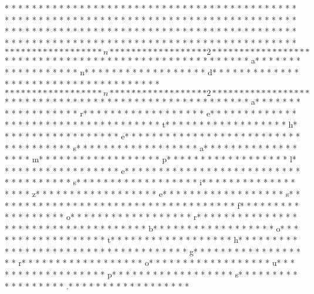 * * *  * * *  * * *  *  * * *  *  * * *  * * *  * * *  *  * * *  *  * * *  * * *  * * *  *  * * *  *  * * *  *  * * *  * * *  * * *  *  * * *  *  * * *  *  * * *  * * *  * * *  *  * * *  *  * * *  *  * * *  * * *  * * *  *  * * *  *  * * *  *  * * *  * * *  * * *  *  * * *  *  * * *  *  * * *  * * *  * * *  *  * * *  *  * * *  *  * * *  * * *  * * *  *  * * *  *  * * *  *  * * *  * * *  * * *  *  * * *  *  * * *  * $* * *  * * *  * * *  *  * * *  *  * * *  * n* * *  * * *  * * *  *  * * *  *  * * *  * 2* * *  * * *  * * *  *  * * *  *  * * *  * $* * *  * * *  * * *  *  * * *  *  * * *  *  * * *  * * *  * * *  *  * * *  *  * * *  * a* * *  * * *  * * *  *  * * *  *  * * *  * n* * *  * * *  * * *  *  * * *  *  * * *  * d* * *  * * *  * * *  *  * * *  *  * * *  *  * * *  * * *  * * *  *  * * *  *  * * *  * $* * *  * * *  * * *  *  * * *  *  * * *  * n* * *  * * *  * * *  *  * * *  *  * * *  * 2* * *  * * *  * * *  *  * * *  *  * * *  * $* * *  * * *  * * *  *  * * *  *  * * *  *  * * *  * * *  * * *  *  * * *  *  * * *  * a* * *  * * *  * * *  *  * * *  *  * * *  * r* * *  * * *  * * *  *  * * *  *  * * *  * e* * *  * * *  * * *  *  * * *  *  * * *  *  * * *  * * *  * * *  *  * * *  *  * * *  * t* * *  * * *  * * *  *  * * *  *  * * *  * h* * *  * * *  * * *  *  * * *  *  * * *  * e* * *  * * *  * * *  *  * * *  *  * * *  *  * * *  * * *  * * *  *  * * *  *  * * *  * s* * *  * * *  * * *  *  * * *  *  * * *  * a* * *  * * *  * * *  *  * * *  *  * * *  * m* * *  * * *  * * *  *  * * *  *  * * *  * p* * *  * * *  * * *  *  * * *  *  * * *  * l* * *  * * *  * * *  *  * * *  *  * * *  * e* * *  * * *  * * *  *  * * *  *  * * *  *  * * *  * * *  * * *  *  * * *  *  * * *  * s* * *  * * *  * * *  *  * * *  *  * * *  * i* * *  * * *  * * *  *  * * *  *  * * *  * z* * *  * * *  * * *  *  * * *  *  * * *  * e* * *  * * *  * * *  *  * * *  *  * * *  * s* * *  * * *  * * *  *  * * *  *  * * *  *  * * *  * * *  * * *  *  * * *  *  * * *  * f* * *  * * *  * * *  *  * * *  *  * * *  * o* * *  * * *  * * *  *  * * *  *  * * *  * r* * *  * * *  * * *  *  * * *  *  * * *  *  * * *  * * *  * * *  *  * * *  *  * * *  * b* * *  * * *  * * *  *  * * *  *  * * *  * o* * *  * * *  * * *  *  * * *  *  * * *  * t* * *  * * *  * * *  *  * * *  *  * * *  * h* * *  * * *  * * *  *  * * *  *  * * *  *  * * *  * * *  * * *  *  * * *  *  * * *  * g* * *  * * *  * * *  *  * * *  *  * * *  * r* * *  * * *  * * *  *  * * *  *  * * *  * o* * *  * * *  * * *  *  * * *  *  * * *  * u* * *  * * *  * * *  *  * * *  *  * * *  * p* * *  * * *  * * *  *  * * *  *  * * *  * s* * *  * * *  * * *  *  * * *  *  * * *  * .* * *  * * *  * * *  *  * * *  *  * * *  * 
